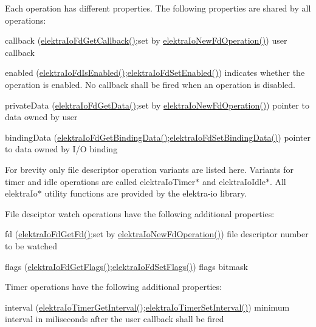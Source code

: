 Each operation has different properties. The following properties are shared by all operations\+:
\begin{DoxyItemize}
\item callback (\hyperlink{io_8c_a885381fdd55cf957af1d65db7522899a}{elektra\+Io\+Fd\+Get\+Callback()};set by \hyperlink{io_8c_a3804183da1aecdfcf09455d246c3891c}{elektra\+Io\+New\+Fd\+Operation()}) user callback
\item enabled (\hyperlink{io_8c_af35cfd8a33db0170e06cb8c3cdc08244}{elektra\+Io\+Fd\+Is\+Enabled()};\hyperlink{io_8c_a56f8b0059e6c7708681624d1994e4b44}{elektra\+Io\+Fd\+Set\+Enabled()}) indicates whether the operation is enabled. No callback shall be fired when an operation is disabled.
\item private\+Data (\hyperlink{io_8c_a6a2a281c9e437dd1d660f1310fa06108}{elektra\+Io\+Fd\+Get\+Data()};set by \hyperlink{io_8c_a3804183da1aecdfcf09455d246c3891c}{elektra\+Io\+New\+Fd\+Operation()}) pointer to data owned by user
\item binding\+Data (\hyperlink{io_8c_a6103b457ed1440d0490acf0a6ec17386}{elektra\+Io\+Fd\+Get\+Binding\+Data()};\hyperlink{io_8c_ae02ec122aafa67b7dd92d9c3daa6499e}{elektra\+Io\+Fd\+Set\+Binding\+Data()}) pointer to data owned by I/O binding
\end{DoxyItemize}

For brevity only file descriptor operation variants are listed here. Variants for timer and idle operations are called {\ttfamily elektra\+Io\+Timer$\ast$} and {\ttfamily elektra\+Io\+Idle$\ast$}. All {\ttfamily elektra\+Io$\ast$} utility functions are provided by the {\ttfamily elektra-\/io} library.

File desciptor watch operations have the following additional properties\+:
\begin{DoxyItemize}
\item fd (\hyperlink{io_8c_a7dec6afadd09f6350f9ad642906fc88a}{elektra\+Io\+Fd\+Get\+Fd()};set by \hyperlink{io_8c_a3804183da1aecdfcf09455d246c3891c}{elektra\+Io\+New\+Fd\+Operation()}) file descriptor number to be watched
\item flags (\hyperlink{io_8c_a8e2d356be0d89af3e46ebc8ce675db37}{elektra\+Io\+Fd\+Get\+Flags()};\hyperlink{io_8c_a1fd34686b0b3b1db5f460ea8c40ba5a8}{elektra\+Io\+Fd\+Set\+Flags()}) flags bitmask
\end{DoxyItemize}

Timer operations have the following additional properties\+:
\begin{DoxyItemize}
\item interval (\hyperlink{io_8c_abc383110a8cb712a0a35b958b4e446ea}{elektra\+Io\+Timer\+Get\+Interval()};\hyperlink{io_8c_a3e317e4c6e5869f296261c24312507ed}{elektra\+Io\+Timer\+Set\+Interval()}) minimum interval in miliseconds after the user callback shall be fired
\end{DoxyItemize}

